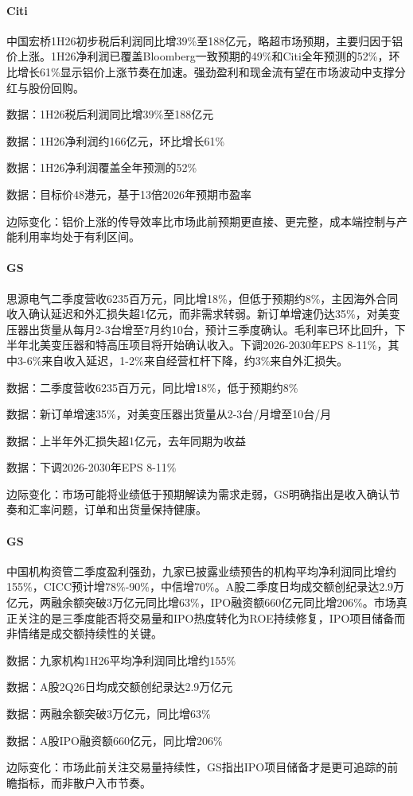 \documentclass[11pt]{ctexart}
\begin{document}
\paragraph{Citi} 中国宏桥1H26初步税后利润同比增39\%至188亿元，略超市场预期，主要归因于铝价上涨。1H26净利润已覆盖Bloomberg一致预期的49\%和Citi全年预测的52\%，环比增长61\%显示铝价上涨节奏在加速。强劲盈利和现金流有望在市场波动中支撑分红与股份回购。
{\small\color{refgray}数据：1H26税后利润同比增39\%至188亿元\par}
{\small\color{refgray}数据：1H26净利润约166亿元，环比增长61\%\par}
{\small\color{refgray}数据：1H26净利润覆盖全年预测的52\%\par}
{\small\color{refgray}数据：目标价48港元，基于13倍2026年预期市盈率\par}
{\small\color{refgray}边际变化：铝价上涨的传导效率比市场此前预期更直接、更完整，成本端控制与产能利用率均处于有利区间。\par}
\paragraph{GS} 思源电气二季度营收6235百万元，同比增18\%，但低于预期约8\%，主因海外合同收入确认延迟和外汇损失超1亿元，而非需求转弱。新订单增速仍达35\%，对美变压器出货量从每月2-3台增至7月约10台，预计三季度确认。毛利率已环比回升，下半年北美变压器和特高压项目将开始确认收入。下调2026-2030年EPS 8-11\%，其中3-6\%来自收入延迟，1-2\%来自经营杠杆下降，约3\%来自外汇损失。
{\small\color{refgray}数据：二季度营收6235百万元，同比增18\%，低于预期约8\%\par}
{\small\color{refgray}数据：新订单增速35\%，对美变压器出货量从2-3台/月增至10台/月\par}
{\small\color{refgray}数据：上半年外汇损失超1亿元，去年同期为收益\par}
{\small\color{refgray}数据：下调2026-2030年EPS 8-11\%\par}
{\small\color{refgray}边际变化：市场可能将业绩低于预期解读为需求走弱，GS明确指出是收入确认节奏和汇率问题，订单和出货量保持健康。\par}
\paragraph{GS} 中国机构资管二季度盈利强劲，九家已披露业绩预告的机构平均净利润同比增约155\%，CICC预计增78\%-90\%，中信增70\%。A股二季度日均成交额创纪录达2.9万亿元，两融余额突破3万亿元同比增63\%，IPO融资额660亿元同比增206\%。市场真正关注的是三季度能否将交易量和IPO热度转化为ROE持续修复，IPO项目储备而非情绪是成交额持续性的关键。
{\small\color{refgray}数据：九家机构1H26平均净利润同比增约155\%\par}
{\small\color{refgray}数据：A股2Q26日均成交额创纪录达2.9万亿元\par}
{\small\color{refgray}数据：两融余额突破3万亿元，同比增63\%\par}
{\small\color{refgray}数据：A股IPO融资额660亿元，同比增206\%\par}
{\small\color{refgray}边际变化：市场此前关注交易量持续性，GS指出IPO项目储备才是更可追踪的前瞻指标，而非散户入市节奏。\par}
\end{document}
